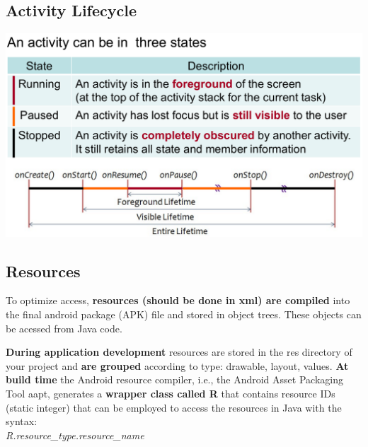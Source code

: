 \subsection{Activity Lifecycle}
\begin{breakbox}

\includegraphics[width=.24\textwidth]{figures/activityLifecycle.png}
\end{breakbox}

\subsection{Resources}
\begin{breakbox}

To optimize access, \textbf{resources (should be done in xml) are
compiled} into the final android package (APK) file and stored in object
trees. These objects can be acessed from Java code.

\textbf{During application development} resources are stored in the res
directory of your project and \textbf{are grouped} according to type:
drawable, layout, values.
\textbf{At build time} the Android resource compiler, i.e., the Android
Asset Packaging Tool aapt, generates a \textbf{wrapper class called R}
that contains resource IDs (static integer) that can be employed to
access the resources in Java with the syntax:\\
\emph{R.resource\_type.resource\_name}
\end{breakbox}
